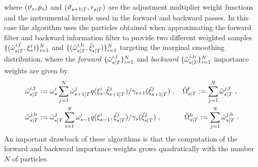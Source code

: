 where $(\adjfuncforward{s},\kissforward{s}{s})$ and $(\adjfunc{s+1}{T}{},\kiss{s}{T})$ are the adjustment multiplier weight functions and the instrumental kernels used in the forward and backward passes. In this case the algorithm uses the particles obtained when approximating the forward filter and backward information filter to provide two different weighted samples
$\{ (\tilde{\omega}_{s|T}^{i,\mathrm{f}}, \xi_{s}^{i}) \}_{i=1}^N$ and $\{ (\tilde{\omega}_{s|T}^{i,\mathrm{b}}, {\check{\xi}}_{s|T}^{i}) \}_{i=1}^N$ targeting the marginal smoothing distribution, where the
\emph{forward} $\{ \tilde{\omega}_{s|T}^{i, \mathrm{f}} \}_{i=1}^N$ and \emph{backward} $\{ \tilde{\omega}_{s|T}^{i, \mathrm{b}} \}_{i=1}^N$ importance weights are given by
\begin{align}
\label{eq:definition-smoothing-weight-forward}
&\tilde{\omega}_{s|T}^{i, \mathrm{f}} := \omega_{s}^{i} \sum_{j=1}^N {\check{\omega}}_{s+1|T}^{j} q(\xi_{s}^{i},{\check{\xi}}_{s+1|T}^{j})/\gamma_{s+1}({\check{\xi}}_{s+1|T}^{j})\;,\quad \tilde{\Omega}^{\mathrm{f}}_{s|T}:=\sum_{j=1}^N \tilde{\omega}_{s|T}^{j, \mathrm{f}}\;, \\
\label{eq:definition-smoothing-weight-backward}
&\tilde{\omega}_{s|T}^{j, \mathrm{b}} := {\check{\omega}}_{s|T}^{j} \sum_{i=1}^N \omega_{s-1}^{i} q(\xi_{s-1}^{i},{\check{\xi}}_{s|T}^{j})/\gamma_{s}({\check{\xi}}_{s|T}^{j})\;,\quad \hspace{.8cm}\tilde{\Omega}^{\mathrm{b}}_{s|T}:=\sum_{j=1}^N \tilde{\omega}_{s|T}^{j, \mathrm{b}} \;.
\end{align}
An important drawback of these algorithms is that the computation of the forward and backward importance weights grows quadratically with the number $N$ of particles.

